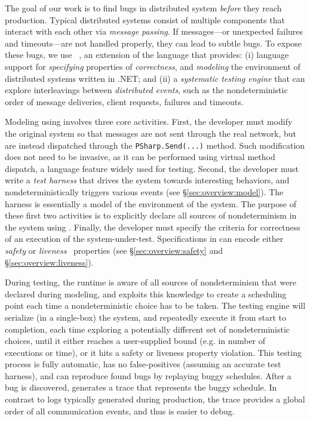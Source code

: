 The goal of our work is to find bugs in distributed system \emph{before} they reach production. Typical distributed systems consist of multiple components that interact with each other via \emph{message passing}. If messages---or unexpected failures and timeouts---are not handled properly, they can lead to subtle bugs. To expose these bugs, we use \psharp~\cite{deligiannis2015psharp}, an extension of the \csharp language that provides: (i) language support for \emph{specifying} properties of \emph{correctness}, and \emph{modeling} the environment of distributed systems written in .NET; and (ii) a \emph{systematic testing engine} that can explore interleavings between \emph{distributed events}, such as the nondeterministic order of message deliveries, client requests, failures and timeouts.

Modeling using \psharp involves three core activities. First, the developer must modify the original system so that messages are not sent through the real network, but are instead dispatched through the \texttt{PSharp.Send(...)} method. Such modification does not need to be invasive, as it can be performed using virtual method dispatch, a \csharp language feature widely used for testing. Second, the developer must write a \psharp \emph{test harness} that drives the system towards interesting behaviors, and nondeterministically triggers various events (see \S\ref{sec:overview:model}). The harness is essentially a model of the environment of the system. The purpose of these first two activities is to explicitly declare all sources of nondeterminism in the system using \psharp. Finally, the developer must specify the criteria for correctness of an execution of the system-under-test. Specifications in \psharp can encode either \emph{safety} or \emph{liveness}~\cite{lamport1977proving} properties (see \S\ref{sec:overview:safety} and \S\ref{sec:overview:liveness}).

During testing, the \psharp runtime is aware of all sources of nondeterminism that were declared during modeling, and exploits this knowledge to create a scheduling point each time a nondeterministic choice has to be taken. The \psharp testing engine will serialize (in a single-box) the system, and repeatedly execute it from start to completion, each time exploring a potentially different set of nondeterministic choices, until it either reaches a user-supplied bound (e.g. in number of executions or time), or it hits a safety or liveness property violation. This testing process is fully automatic, has no false-positives (assuming an accurate test harness), and can reproduce found bugs by replaying buggy schedules. After a bug is discovered, \psharp generates a trace that represents the buggy schedule. In contrast to logs typically generated during production, the \psharp trace provides a global order of all communication events, and thus is easier to debug.

